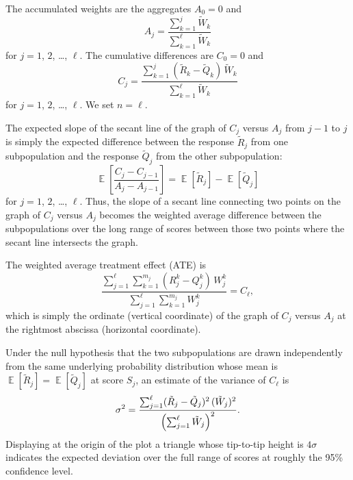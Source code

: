 \documentclass[]{fairmeta}
\DeclareMathOperator{\E}{\mathop{}\mathbb{E}}
\begin{document}
The accumulated weights are the aggregates $A_0 = 0$ and
%
\begin{equation}
A_j = \frac{\sum_{k=1}^j \tilde{W}_k}{\sum_{k=1}^{\ell} \tilde{W}_k}
\end{equation}
%
for $j = 1$, $2$, \dots, $\ell$.
The cumulative differences are $C_0 = 0$ and
%
\begin{equation}
C_j = \frac{\sum_{k=1}^j (\tilde{R}_k - \tilde{Q}_k) \, \tilde{W}_k}
           {\sum_{k=1}^{\ell} \tilde{W}_k}
\end{equation}
%
for $j = 1$, $2$, \dots, $\ell$.
We set $n = \ell$.

The expected slope of the secant line of the graph of $C_j$ versus $A_j$
from $j-1$ to $j$ is simply the expected difference
between the response $\tilde{R}_j$ from one subpopulation and the response
$\tilde{Q}_j$ from the other subpopulation:
%
\begin{equation}
\E\left[ \frac{C_j - C_{j-1}}{A_j - A_{j-1}} \right]
= \E[ \tilde{R}_j ] - \E[ \tilde{Q}_j ]
\end{equation}
%
for $j = 1$, $2$, \dots, $\ell$.
Thus, the slope of a secant line connecting two points on the graph
of $C_j$ versus $A_j$ becomes the weighted average difference
between the subpopulations over the long range of scores
between those two points where the secant line intersects the graph.

The weighted average treatment effect (ATE) is
%
\begin{equation}
\frac{\sum_{j=1}^{\ell} \sum_{k=1}^{m_j} (R_j^k - Q_j^k) \, W_j^k}
     {\sum_{j=1}^{\ell} \sum_{k=1}^{m_j} W_j^k} = C_{\ell},
\end{equation}
%
which is simply the ordinate (vertical coordinate) of the graph
of $C_j$ versus $A_j$ at the rightmost abscissa (horizontal coordinate).

Under the null hypothesis that the two subpopulations are drawn
independently from the same underlying probability distribution
whose mean is $\E[\tilde{R}_j] = \E[\tilde{Q}_j]$ at score $S_j$,
an estimate of the variance of $C_\ell$ is
%
\begin{equation}
\sigma^2 = \frac{\sum_{j=1}^{\ell}
                 (\tilde{R}_j - \tilde{Q}_j)^2 \, (\tilde{W}_j)^2}
                {\Bigl( \sum_{j=1}^{\ell} \tilde{W}_j \Bigr)^2}.
\end{equation}
%
Displaying at the origin of the plot a triangle whose tip-to-tip height
is $4\sigma$ indicates the expected deviation over the full range of scores
at roughly the 95\% confidence level.
\end{document}
